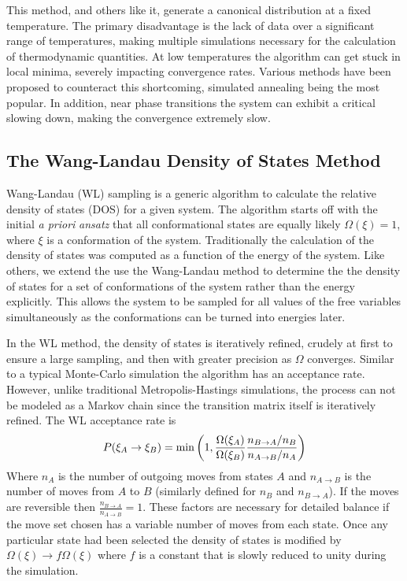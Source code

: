 This method, and others like it, generate a canonical distribution at a fixed temperature. The primary disadvantage is the lack of data over a significant range of temperatures, making multiple simulations necessary for the calculation of thermodynamic quantities. At low temperatures the algorithm can get stuck in local minima, severely impacting convergence rates. Various methods have been proposed to counteract this shortcoming, simulated annealing\cite{kirkpatrick_optimization_1983} being the most popular. In addition, near phase transitions the system can exhibit a critical slowing down, making the convergence extremely slow.\cite{yahata_critical_1969} 

\subsection{The Wang-Landau Density of States Method}
\label{sec:wang_landau}

Wang-Landau (WL) sampling\cite{wang_determining_2001} is a generic algorithm to calculate the relative density of states (DOS) for a given system. The algorithm starts off with the initial \textit{a priori} \textit{ansatz} that all conformational states are equally likely $\Omega(\xi)=1$, where $\xi$ is a conformation of the system.  Traditionally the calculation of the density of states was computed as a function of the energy of the system. Like others, we extend the use the Wang-Landau method to determine the the density of states for a set of conformations of the system rather than the energy explicitly.\cite{patel_effect_2008, wust_versatile_2009} This allows the system to be sampled for all values of the free variables simultaneously as the conformations can be turned into energies later.

In the WL method, the density of states is iteratively refined, crudely at first to ensure a large sampling, and then with greater precision as $\Omega$ converges. Similar to a typical Monte-Carlo simulation the algorithm has an acceptance rate. However, unlike traditional Metropolis-Hastings simulations, the process can not be modeled as a Markov chain since the transition matrix itself is iteratively refined. The WL acceptance rate is
\begin{equation}
  P(\xi_A \rightarrow \xi_B) = \min 
  \left(  
    1, \frac{\Omega(\xi_A)}{\Omega(\xi_B)} \frac{n_{B \rightarrow A}/n_B}{n_{A \rightarrow B}/n_A} 
   \right)
\end{equation}
Where $n_A$ is the number of outgoing moves from states $A$ and $n_{A \rightarrow B}$ is the number of moves from $A$ to $B$ (similarly defined for $n_B$ and $n_{B \rightarrow A}$). If the moves are reversible then $\frac{n_{B \rightarrow A}}{n_{A \rightarrow B}}=1$. These factors are necessary for detailed balance if the move set chosen has a variable number of moves from each state. Once any particular state had been selected the density of states is modified by $\Omega(\xi) \rightarrow f\Omega(\xi)$ where $f$ is a constant that is slowly reduced to unity during the simulation. 

